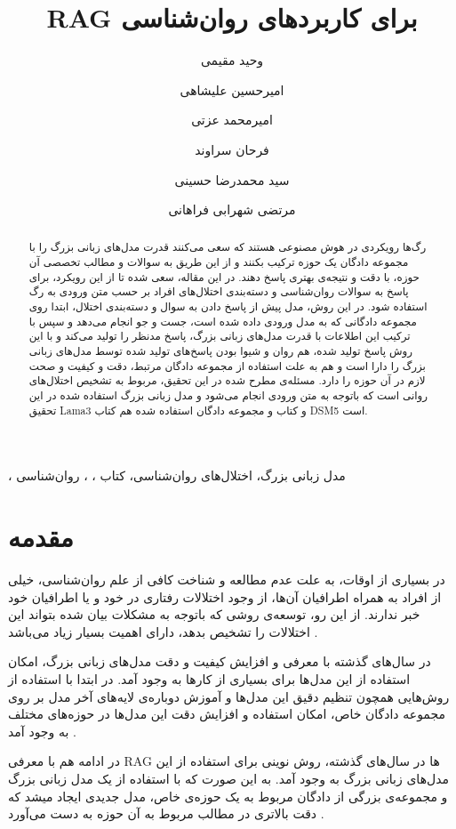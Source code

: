 \documentclass{CCI2020}
\title{
 RAG برای کاربردهای روان‌شناسی
}
\date{}
\author{وحید مقیمی}
\author{امیرحسین علیشاهی}
\author{امیرمحمد عزتی}
\author{فرحان سراوند}
\author{سید محمدرضا حسینی}
\author{مرتضی شهرابی فراهانی}
\affil[1]{
    \lr{Vahidmoghimi@rocketmail.com, a.h.alishahi.cs@gmail.com, iamirezzati@gmail.com} 
}
\affil[1]{
    \lr{smr.hosseini@ce.sharif.edu, farhansaravand@gmail.com,  morteza.shahrabii@gmail.com}
}
\begin{document}
\maketitle
\thispagestyle{firstpage}
\begin{abstract}
رگ‌ها رویکردی در هوش مصنوعی هستند که سعی می‌کنند قدرت مدل‌های زبانی بزرگ را با مجموعه دادگان یک حوزه ترکیب بکنند و از این طریق به سوالات و مطالب تخصصی آن حوزه، با دقت و نتیجه‌ی بهتری پاسخ دهند. در این مقاله، سعی شده تا از این رویکرد، برای پاسخ به سوالات روان‌شناسی و دسته‌بندی اختلال‌های افراد بر حسب متن ورودی به رگ استفاده شود. در این روش، مدل پیش از پاسخ دادن به سوال و دسته‌بندی اختلال، ابتدا روی مجموعه دادگانی که به مدل ورودی داده شده است، جست و جو انجام می‌دهد و سپس با ترکیب این اطلاعات با قدرت مدل‌های زبانی بزرگ، پاسخ مدنظر را تولید می‌کند و با این روش پاسخ تولید شده، هم روان و شیوا بودن پاسخ‌های تولید شده توسط مدل‌های زبانی بزرگ را دارا است و هم به علت استفاده از مجموعه دادگان مرتبط، دقت و کیفیت و صحت لازم در آن حوزه را دارد. مسئله‌ی مطرح شده در این تحقیق، مربوط به تشخیص اختلال‌های روانی است که باتوجه به متن ورودی انجام می‌شود و مدل زبانی بزرگ استفاده شده در این تحقیق Lama3 و کتاب و مجموعه دادگان استفاده شده هم کتاب DSM5  است.
 \end{abstract}
\begin{keywords}
، مدل زبانی بزرگ، اختلال‌های روان‌شناسی، کتاب ، ، روان‌شناسی
\end{keywords}


\section{مقدمه}

در بسیاری از اوقات، به علت عدم مطالعه و شناخت کافی از علم روان‌شناسی، خیلی از افراد به همراه اطرافیان آن‌ها، از وجود اختلالات رفتاری در خود و یا اطرافیان خود خبر ندارند. از این رو، توسعه‌ی روشی که باتوجه به مشکلات بیان شده بتواند این اختلالات را تشخیص بدهد، دارای اهمیت بسیار زیاد می‌باشد \cite{psychology_overview}.

در سال‌های گذشته با معرفی و افزایش کیفیت و دقت مدل‌های زبانی بزرگ، امکان استفاده از این مدل‌ها برای بسیاری از کارها به وجود آمد. در ابتدا با استفاده از روش‌هایی همچون تنظیم دقیق این مدل‌ها و آموزش دوباره‌ی لایه‌های آخر مدل بر روی مجموعه دادگان خاص، امکان استفاده و افزایش دقت این مدل‌ها در حوزه‌های مختلف به وجود آمد \cite{big_language_models}.

در ادامه هم با معرفی RAG ها در سال‌های گذشته، روش نوینی برای استفاده از این مدل‌های زبانی بزرگ به وجود آمد. به این صورت که با استفاده از یک مدل زبانی بزرگ و مجموعه‌ی بزرگی از دادگان مربوط به یک حوزه‌ی خاص، مدل جدیدی ایجاد میشد که دقت بالاتری در مطالب مربوط به آن حوزه به دست می‌آورد \cite{rag_models}.
\end{document}
